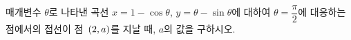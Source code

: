 매개변수 $\theta$로 나타낸 곡선 $x=1-\cos\theta$, $y=\theta-\sin\theta$에 대하여 $\theta=\dfrac{\pi}{2}$에 대응하는 점에서의 접선이 점~$(2{,}\mkern3mu\mathopen{}a)$를 지날 때, $a$의 값을 구하시오.
